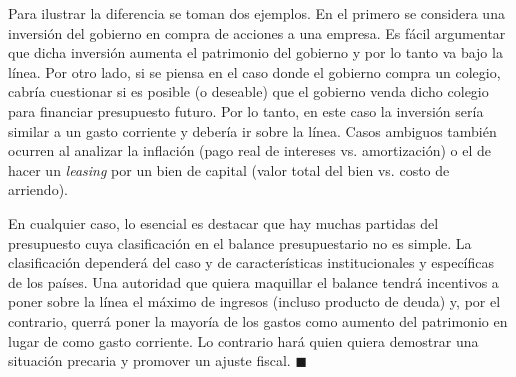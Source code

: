 \documentclass[DeGregorioResumen]{subfiles}
\begin{document}
Para ilustrar la diferencia se toman dos ejemplos. En el primero se considera una inversión del gobierno en compra de acciones a una empresa. Es fácil argumentar que dicha inversión aumenta el patrimonio del gobierno y por lo tanto va bajo la línea. Por otro lado, si se piensa en el caso donde el gobierno compra un colegio, cabría cuestionar si es posible (o deseable) que el gobierno venda dicho colegio para financiar presupuesto futuro. Por lo tanto, en este caso la inversión sería similar a un gasto corriente y debería ir sobre la línea. Casos ambiguos también ocurren al analizar la inflación (pago real de intereses vs. amortización) o el de hacer un \textit{leasing} por un bien de capital (valor total del bien vs. costo de arriendo).

En cualquier caso, lo esencial es destacar que hay muchas partidas del presupuesto cuya clasificación en el balance presupuestario no es simple. La clasificación dependerá del caso y de características institucionales y específicas de los países. Una autoridad que quiera maquillar el balance tendrá incentivos a poner sobre la línea el máximo de ingresos (incluso producto de deuda) y, por el contrario, querrá poner la mayoría de los gastos como aumento del patrimonio en lugar de como gasto corriente. Lo contrario hará quien quiera demostrar una situación precaria y promover un ajuste fiscal. $\blacksquare$
\end{document}
